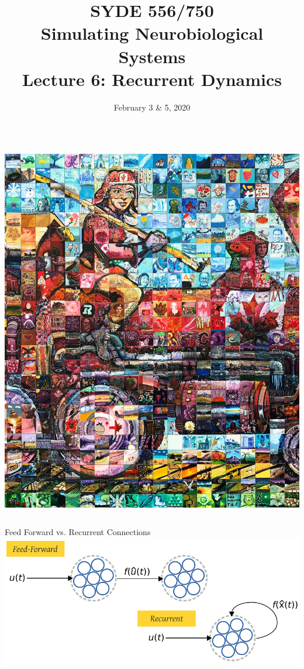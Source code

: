 \documentclass[handout,aspectratio=169]{beamer}
\date{February 3 \& 5, 2020}
\title{SYDE 556/750 \\ Simulating Neurobiological Systems \\ Lecture 6: Recurrent Dynamics}
\begin{document}
	
	\begin{frame}{}
		\vspace{0.5cm}
		\begin{columns}[c]
			\MakeTitle
			\includegraphics[width=\textwidth]{media/canada_150_mosaic_engine_small.jpg}
		\end{columns}
	\end{frame}

	\begin{frame}{Feed Forward vs. Recurrent Connections}
		\centering
		\includegraphics{media/feed_forward_recurrent.pdf}
	\end{frame}
\end{document}
